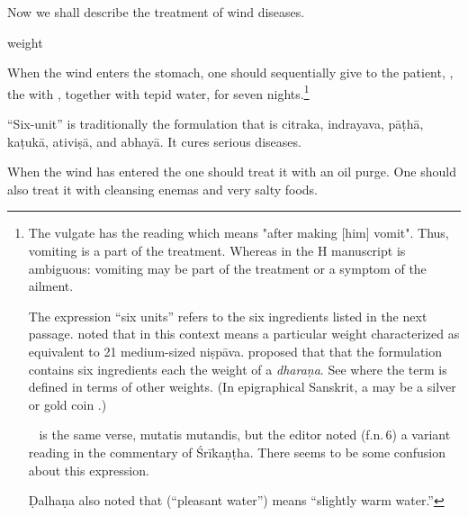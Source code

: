 \begin{translation}
    
    \item [1] 
    Now we shall describe the treatment of wind diseases.
    
    weight

    \item [3] When the wind enters the stomach, one should sequentially give to
the patient, , the  with
,  together with tepid water, for seven
nights.\footnote{The vulgate has the reading  which means
    "after making [him] vomit". Thus, vomiting is a part of the treatment.
    Whereas  in the H manuscript is ambiguous:  vomiting may be 
    part of the treatment or a symptom of the ailment.
    
The expression “six units” refers to the six ingredients listed in the next
passage.   noted that  in this context 
means a
particular weight characterized as equivalent to 21 medium-sized \gls{niṣpāva}.
\citet[303]{shar-1999} proposed that that the formulation contains six
ingredients each the weight of a \emph{dharaṇa}.  See  where 
the
term  is defined in terms of other weights.  (In epigraphical 
Sanskrit, a  may be a silver or gold coin \citep[91]{sirc-1966}.)

 \AH\  is the same verse, mutatis mutandis, but the editor 
 noted 
 (f.n.\,6) a variant reading  in the commentary of Śrīkaṇṭha.  
 There seems to be some confusion about this expression.

Ḍalhaṇa also noted that  (“pleasant water”) means “slightly 
warm water.”}

    \item [4]
    
    “Six-unit” is traditionally the formulation that is 
\gls{citraka}, \gls{indrayava}, \gls{pāṭhā},
\gls{kaṭukā}, \gls{ativiṣā}, and \gls{abhayā}. It cures serious
diseases.



    \item [5]
    When the wind has entered the  one should treat it 
    with an oil purge. One should also treat it with cleansing enemas and very 
    salty foods.




\end{translation}
